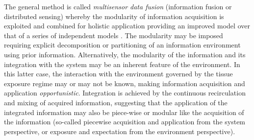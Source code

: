 The general method is called \emph{multisensor data fusion} (information fusion or distributed sensing) whereby the modularity of information acquisition is exploited and combined for holistic application providing an improved model over that of a series of independent models \cite{Hall2004}.  The modularity may be imposed requiring explicit decomposition or partitioning of an information environment using prior information. Alternatively, the modularity of the information and its integration with the system may be an inherent feature of the environment. In this latter case, the interaction with the environment governed by the tissue exposure regime may or may not be known, making information acquisition and application \emph{opportunistic}. Integration is achieved by the continuous recirculation and mixing of acquired information, suggesting that the application of the integrated information may also be piece-wise or modular like the acquisition of the information (so-called piecewise acquisition and application from the system perspective, or exposure and expectation from the environment perspective).

%
%
